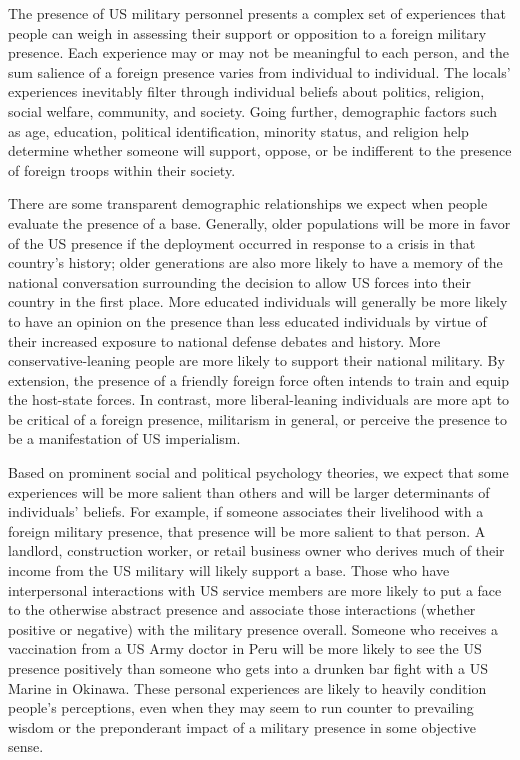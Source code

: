 The presence of US military personnel presents a complex set of experiences that people can weigh in assessing their support or opposition to a foreign military presence. Each experience may or may not be meaningful to each person, and the sum salience of a foreign presence varies from individual to individual. The locals' experiences inevitably filter through individual beliefs about politics, religion, social welfare, community, and society. Going further, demographic factors such as age, education, political identification, minority status, and religion help determine whether someone will support, oppose, or be indifferent to the presence of foreign troops within their society. 

There are some transparent demographic relationships we expect when people evaluate the presence of a base. Generally, older populations will be more in favor of the US presence if the deployment occurred in response to a crisis in that country's history; older generations are also more likely to have a memory of the national conversation surrounding the decision to allow US forces into their country in the first place. More educated individuals will generally be more likely to have an opinion on the presence than less educated individuals by virtue of their increased exposure to national defense debates and history. More conservative-leaning people are more likely to support their national military. By extension, the presence of a friendly foreign force often intends to train and equip the host-state forces. In contrast, more liberal-leaning individuals are more apt to be critical of a foreign presence, militarism in general, or perceive the presence to be a manifestation of US imperialism.

Based on prominent social and political psychology theories, we expect that some experiences will be more salient than others and will be larger determinants of individuals' beliefs. For example, if someone associates their livelihood with a foreign military presence, that presence will be more salient to that person. A landlord, construction worker, or retail business owner who derives much of their income from the US military will likely support a base. Those who have interpersonal interactions with US service members are more likely to put a face to the otherwise abstract presence and associate those interactions (whether positive or negative) with the military presence overall.\autocite{Allen2020} Someone who receives a vaccination from a US Army doctor in Peru will be more likely to see the US presence positively than someone who gets into a drunken bar fight with a US Marine in Okinawa.\autocite{Flynn2018} These personal experiences are likely to heavily condition people's perceptions, even when they may seem to run counter to prevailing wisdom or the preponderant impact of a military presence in some objective sense.\autocite{Taber2006,Shapiro2017}

